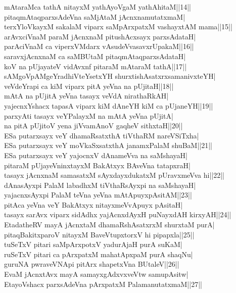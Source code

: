 \documentclass{article}
\begin{document}
mAtaraMca tathA nitayxM yathAyoVgaM yathAhitaM||14||\\
pitaqmAtaqparxsAdeVna saMjAtaM jAcnxnamutatxmaM|\\
terxYloVkayxM sakalaM viparx saMpArxpatxM vashayxtAM mama||15||\\
arAvxciVnaM paraM jAcnxnaM pitushAcxsayx parxsAdataH|\\
parAciVnaM ca viperxVMdarx vAsudeVvasavxrUpakaM||16||\\
saravxjAcnxnaM ca saMBUtaM pitaqmAtaqparxsAdataH|\\
koV na pUjayateV vidAvxnf pitaraM mAtaraM tathA||17||\\
sAMgoVpAMgeYradhiVteYsetxYH shurxtishAsatxrxsamanivxteYH|\\
veVdeYrapi ca kiM viparx pitA yeVna na pUjitaH||18||\\
mAtA na pUjitA yeVna tasayx veVdA nirathaRkAH|\\
yajecnxYshacx tapasA viparx kiM dAneYH kiM ca pUjaneYH||19||\\
parxyAti tasayx veYPalayxM na mAtA yeVna pUjitA|\\
na pitA pUjitoV yena jiVvamAnoV gaqheV sithxtaH||20||\\
ESa putarxsayx veY dhamaRsatxthA tiVthaRM nareVSiTxha|\\
ESa putarxsayx veY moVkaSxsatxthA janamxPalaM shuBaM||21||\\
ESa putarxsayx veY yajocnxV dAnameVva na saMshayaH|\\
pitaraM pUjayeVninxtayxM BakAtxyx BAveVna tatapxraH|\\
tasayx jAcnxnaM samasatxM sAyxdayxdukatxM pUravxmeVva hi||22||\\
dAnasAyxpi PalaM labadhxM tiVthaRsAyxpi na saMshayaH|\\
yajacnxsAyxpi PalaM teVna yeVna mAtApuyxpAsitAM||23||\\
pitAca yeVna veY BakAtxyx nitayxmeVvApuyx pAsitaH|\\
tasayx sarAvx viparx sidAdhx yajAcnxdAyxH puNayxdAH kirxyAH||24||\\
EtadatheRV mayA jAcnxtaM dhamaRshAsatxrxM shurxtaM purA|\\
pitaqBakitxparoV nitayxM BaveVtupxtorxV hi pipapxla||25||\\
tuSeTxV pitari saMpArxpotxV yadurAjaH purA suKaM|\\
ruSeTxV pitari ca pArxpatxM mahatApxpaM purA shaqNu|\\
guruNA pwraveVNApi pitArx shapetxVna BUtaleV||26||\\
EvaM jAcnxtAvx mayA samayxgAdxvxveVtw samupAsitw|\\
EtayoVshacx parxsAdeVna pArxpatxM PalamanutatxmaM||27||
\end{document}
